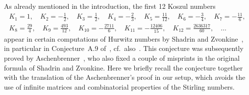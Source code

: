 \documentclass[pdftex]{sigma}
\numberwithin{equation}{section}
\begin{document}
\begin{Remark}\label{rem.proofA9}
As already mentioned in the introduction, the f\/irst 12 Koszul numbers
\begin{gather*} K_1=1, \quad K_2=-\frac{1}{2}, \quad K_3=\frac{1}{2}, \quad K_4=-\frac{2}{3},\quad
K_5=\frac{11}{12}, \quad K_6=-\frac{3}{4}, \quad K_7=-\frac{11}{6},\\
K_8=\frac{29}{4}, \quad K_9=\frac{493}{12}, \quad K_{10}=-\frac{2711}{6}, \quad K_{11}=-\frac{12406}{15}, \quad K_{12}=\frac{2636317}{60},\quad \ldots\end{gather*}
appear in certain computations of Hurwitz numbers by Shadrin and Zvonkine~\cite{SZ}, in particular in Conjecture~A.9 of~\cite{SZ}, cf.\ also~\cite{sloane}. This conjecture was subsequently proved by Aschenbrenner~\cite{Asche}, who also f\/ixed a couple of misprints in the original formula of Shadrin and Zvonkine. Here we brief\/ly recall the conjecture together with the translation of the Aschenbrenner's proof in our setup, which avoids the use of inf\/inite matrices and combinatorial properties of the Stirling numbers.


\end{Remark}
\end{document}
